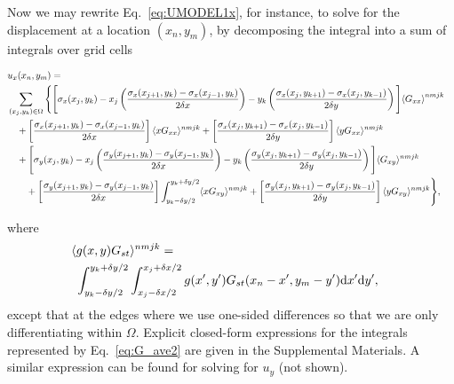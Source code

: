 \documentclass[aps,prl,reprint,twocolumn,groupedaddress,showpacs]{revtex4-1}
\def\dd{\mbox{d}}
\begin{document}
Now we may rewrite Eq.~\ref{eq:UMODEL1x}, for instance, to solve for the displacement at a location $(x_n,y_m)$, by decomposing the integral into a sum of integrals over grid cells
%
\begin{widetext}
\begin{align}
 \lefteqn{u_x(x_n,y_m) =} \nonumber\\
 & \sum_{(x_j,y_k)\in\Omega} \Bigg\{ \Bigg[\sigma_{x}(x_j,y_k)  - x_j\left(\frac{\sigma_{x}(x_{j+1},y_k) - \sigma_{x}(x_{j-1},y_k) }{2\delta x }    \right)    -y_k\left( \frac{\sigma_{x}(x_j,y_{k+1}) -  \sigma_{x}(x_j,y_{k-1}) }{2\delta y}\right) \Bigg]{ \langle G_{xx} \rangle}^{nmjk} \nonumber \\
&\quad+\left[ \frac{\sigma_{x}(x_{j+1},y_k) -  \sigma_{x}(x_{j-1},y_k) }{2\delta x}   \right]\langle xG_{xx} \rangle^{nmjk} + \left[  \frac{\sigma_{x}(x_j,y_{k+1}) - \sigma_{x}(x_j,y_{k-1}) }{2\delta y} \right] \langle yG_{xx} \rangle^{nmjk}\nonumber\\
&\quad+  \Bigg[\sigma_{y}(x_j,y_k) -x_j\left(\frac{\sigma_{y}(x_{j+1},y_k) - \sigma_{y}(x_{j-1},y_k) }{2\delta x}    \right)    -y_k\left( \frac{\sigma_{y}(x_j,y_{k+1}) - \sigma_{y}(x_j,y_{k-1}) }{2\delta y}\right) \Bigg] \langle G_{xy} \rangle^{nmjk}\nonumber \\
&\qquad +\left[ \frac{\sigma_{y}(x_{j+1},y_k) -  \sigma_{y}(x_{j-1},y_k) }{2\delta x}   \right]  \int_{y_k-\delta y/2}^{y_k+\delta y/2}  \langle xG_{xy} \rangle^{nmjk} + \left[  \frac{\sigma_{y}(x_j,y_{k+1}) - \sigma_{y}(x_j,y_{k-1}) }{2\delta y} \right] \langle yG_{xy} \rangle^{nmjk} \Bigg\},
\label{eq:ux_decomposed}
\end{align}
\end{widetext}
where
\begin{align}
\lefteqn{\langle g(x,y)G_{st} \rangle^{nmjk} =}  \nonumber\\
&\  \int_{y_k-\delta y/2}^{y_k+\delta y/2} \int_{x_j-\delta x/2}^{x_j+\delta x/2} g(x',y')G_{st}(x_n-x',y_m-y') \dd x' \dd y', \label{eq:G_ave} 
\end{align}
except that at the edges where we use one-sided differences so that we are only differentiating within $\Omega$. Explicit 
closed-form expressions for the integrals represented by Eq.~\ref{eq:G_ave2} are given in the Supplemental Materials. A similar expression can be found for solving for $u_y$ (not shown).
\end{document}

